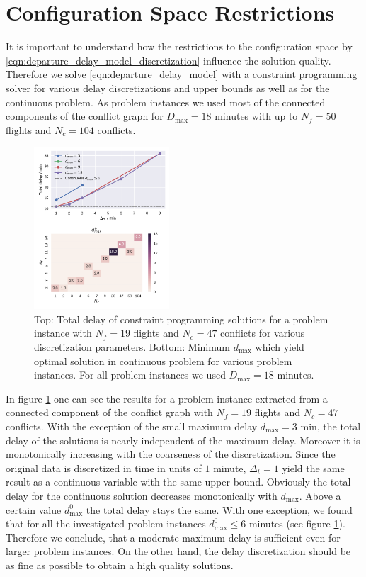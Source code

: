 \section{Configuration Space Restrictions}
It is important to understand how the restrictions to the configuration space by \eqref{eqn:departure_delay_model_discretization} influence the solution quality.
Therefore we solve \eqref{eqn:departure_delay_model} with a constraint programming solver \cite{numberjack} for various delay discretizations and upper bounds as well as for the continuous problem.
As problem instances we used most of the connected components of the conflict graph for $D_\text{max}=18$ minutes with up to $N_f=50$ flights and $N_c=104$ conflicts.
\begin{figure}[htpb]
    \centering
    \includegraphics[width=0.45\textwidth,natwidth=1,natheight=0]{./pics/delay_only_cp_results.pdf}
    \caption{Top: Total delay of constraint programming solutions for a problem instance with $N_f=19$ flights and $N_c=47$ conflicts for various discretization parameters.
    Bottom: Minimum $d_\text{max}$ which yield optimal solution in continuous problem for various problem instances. For all problem instances we used $D_\text{max}=18$ minutes.}
    \label{fig:delay_only_cp_results}
\end{figure}

In figure \ref{fig:delay_only_cp_results} one can see the results for a problem instance extracted from a connected component of the conflict graph with $N_f=19$ flights and $N_c=47$ conflicts.
With the exception of the small maximum delay $d_\text{max} = 3$ min, the total delay of the solutions is nearly independent of the maximum delay.
Moreover it is monotonically increasing with the coarseness of the discretization.
Since the original data is discretized in time in units of $1$ minute, $\Delta_t=1$ yield the same result as a continuous variable with the same upper bound.
Obviously the total delay for the continuous solution decreases monotonically with $d_\text{max}$.
Above a certain value $d^0_\text{max}$ the total delay stays the same.
With one exception, we found that for all the investigated problem instances $d^0_\text{max}\leq6$ minutes (see figure \ref{fig:delay_only_cp_results}).
Therefore we conclude, that a moderate maximum delay is sufficient even for larger problem instances.
On the other hand, the delay discretization should be as fine as possible to obtain a high quality solutions.

